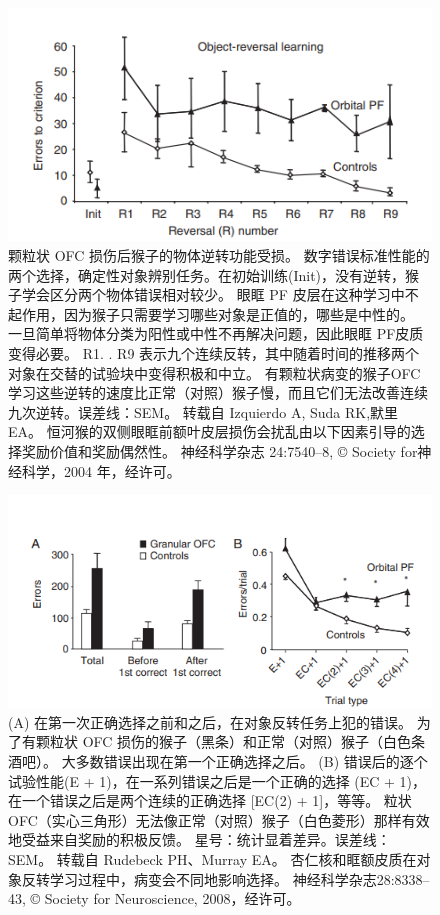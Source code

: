 \begin{figure}[!htb]
	\centering
	\includegraphics{image_pfc/Fig_4_7}
	\caption{颗粒状 OFC 损伤后猴子的物体逆转功能受损。 数字错误标准性能的两个选择，确定性对象辨别任务。在初始训练(Init)，没有逆转，猴子学会区分两个物体错误相对较少。 眼眶 PF 皮层在这种学习中不起作用，因为猴子只需要学习哪些对象是正值的，哪些是中性的。 一旦简单将物体分类为阳性或中性不再解决问题，因此眼眶 PF皮质变得必要。 R1. . R9 表示九个连续反转，其中随着时间的推移两个对象在交替的试验块中变得积极和中立。 有颗粒状病变的猴子OFC 学习这些逆转的速度比正常（对照）猴子慢，而且它们无法改善连续九次逆转。误差线：SEM。 转载自 Izquierdo A, Suda RK,默里EA。 恒河猴的双侧眼眶前额叶皮层损伤会扰乱由以下因素引导的选择奖励价值和奖励偶然性。 神经科学杂志 24:7540–8, © Society for神经科学，2004 年，经许可。}
	\label{fig:fig_4_7}
\end{figure}
\begin{figure}[!htb]
	\centering
	\includegraphics{image_pfc/Fig_4_8}
	\caption{(A) 在第一次正确选择之前和之后，在对象反转任务上犯的错误。 为了有颗粒状 OFC 损伤的猴子（黑条）和正常（对照）猴子（白色条酒吧）。 大多数错误出现在第一个正确选择之后。 (B) 错误后的逐个试验性能(E + 1)，在一系列错误之后是一个正确的选择 (EC + 1)，在一个错误之后是两个连续的正确选择 [EC(2) + 1]，等等。 粒状OFC（实心三角形）无法像正常（对照）猴子（白色菱形）那样有效地受益来自奖励的积极反馈。 星号：统计显着差异。误差线：SEM。 转载自 Rudebeck PH、Murray EA。 杏仁核和眶额皮质在对象反转学习过程中，病变会不同地影响选择。 神经科学杂志28:8338–43, © Society for Neuroscience, 2008，经许可。}
	\label{fig:fig_4_8}
\end{figure}


